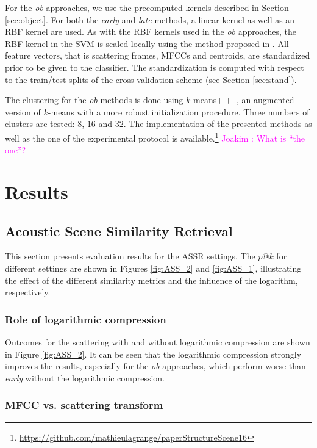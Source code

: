 \documentclass[journal]{IEEEtran}
\makeatletter
\newcommand*{\vs}{vs.\@\xspace}
\newcommand{\ja}[1]{\textcolor{magenta}{Joakim : #1}}
\makeatother
\begin{document}
For the \emph{ob} approaches, we use the precomputed kernels described in Section \ref{sec:object}. For both the \emph{early} and \emph{late} methods, a linear kernel as well as an RBF kernel are used. As with the RBF kernels used in the \emph{ob} approaches, the RBF kernel in the SVM is scaled locally using the method proposed in \cite{selfTuneManor2004}. All feature vectors, that is scattering frames, MFCCs and centroids, are standardized prior to be given to the classifier. The standardization is computed with respect to the train/test splits of the cross validation scheme (see Section \ref{sec:stand}).

The clustering for the \emph{ob} methods is done using $k$-means$++$ \cite{arthur2007k}, an augmented version of $k$-means with a more robust initialization procedure. Three numbers of clusters are tested: $8$, $16$ and $32$. The implementation of the presented methods as well as the one of the experimental protocol is available.\footnote{\url{https://github.com/mathieulagrange/paperStructureScene16}} \ja{What is ``the one''?}

\section{Results \label{sec:results}}


\subsection{Acoustic Scene Similarity Retrieval}

This section presents evaluation results for the ASSR settings. The $p@k$ for different settings are shown in Figures \ref{fig:ASS_2} and \ref{fig:ASS_1}, illustrating the effect of the different similarity metrics and the influence of the logarithm, respectively.

\subsubsection*{Role of logarithmic compression}

Outcomes for the scattering with and without logarithmic compression are shown in Figure \ref{fig:ASS_2}. It can be seen that the logarithmic compression strongly improves the results, especially for the \emph{ob} approaches, which perform worse than \emph{early} without the logarithmic compression.

\subsubsection*{MFCC \vs scattering transform}
\end{document}
